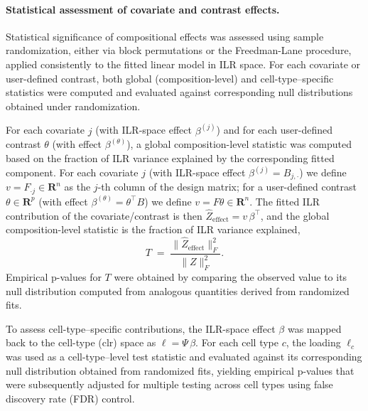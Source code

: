 \documentclass{article}
\begin{document}
\paragraph{Statistical assessment of covariate and contrast effects.}
Statistical significance of compositional effects was assessed using
sample randomization, either via block permutations or the
Freedman-Lane procedure, applied consistently to the fitted linear
model in ILR space. For each covariate or user-defined contrast, both
global (composition-level) and cell-type–specific statistics were
computed and evaluated against corresponding null distributions
obtained under randomization.

For each covariate $j$ (with ILR-space effect $\beta^{(j)}$) and
for each user-defined contrast $\theta$ (with effect
$\beta^{(\theta)}$), a global composition-level statistic was computed
based on the fraction of ILR variance explained by the corresponding
fitted component. For each covariate $j$ (with ILR-space effect
$\beta^{(j)} = B_{j,\cdot}$) we define $v = F_{\cdot j} \in \mathbf{R}^{n}$
as the $j$-th column of the design matrix; for a user-defined contrast
$\theta \in \mathbf{R}^{p}$ (with effect $\beta^{(\theta)} = \theta^\top B$)
we define $v = F\theta \in \mathbf{R}^{n}$. The fitted ILR contribution
of the covariate/contrast is then
$\widehat{Z}_{\mathrm{effect}} = v\,\beta^\top$, and the global
composition-level statistic is the fraction of ILR variance explained,
\[
T \;=\; \frac{\|\widehat{Z}_{\mathrm{effect}}\|_F^2}{\|Z\|_F^2}.
\]
Empirical p-values for $T$ were obtained by comparing the observed value
to its null distribution computed from analogous quantities derived
from randomized fits. 

To assess cell-type–specific contributions, the ILR-space effect
$\beta$ was mapped back to the cell-type (clr) space as
$\ell = \Psi\,\beta$. For each cell type $c$, the loading $\ell_c$ was
used as a cell-type–level test statistic and evaluated against its
corresponding null distribution obtained from randomized fits,
yielding empirical p-values that were subsequently adjusted for
multiple testing across cell types using false discovery rate (FDR)
control.
\end{document}
